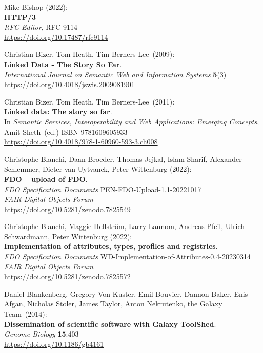 \begin{thebibliography}{9}
Mike Bishop (2022): \\
\textbf{{HTTP}/3}\\
\emph{RFC Editor}, RFC 9114 \\  
\url{https://doi.org/10.17487/rfc9114}

Christian Bizer, Tom Heath, Tim Berners-Lee~(2009):\\
\textbf{Linked Data - The Story So Far}.\\
\emph{International Journal on Semantic Web and Information Systems}
\textbf{5}(3)\\
\url{https://doi.org/10.4018/jswis.2009081901}

Christian Bizer, Tom Heath, Tim Berners-Lee~(2011):\\
\textbf{Linked data: The story so far}.\\
In \emph{Semantic Services, Interoperability and Web Applications:
Emerging Concepts}, Amit Sheth~(ed.) ISBN 9781609605933\\
\url{https://doi.org/10.4018/978-1-60960-593-3.ch008}

Christophe Blanchi, Daan Broeder, Thomas Jejkal, Islam Sharif, Alexander
Schlemmer, Dieter van Uytvanck, Peter Wittenburg (2022): \\
\textbf{FDO -- upload of FDO}.\\
\emph{FDO Specification Documents} PEN-FDO-Upload-1.1-20221017 \\
\emph{FAIR Digital Objects Forum}\\ 
\url{https://doi.org/10.5281/zenodo.7825549}

Christophe Blanchi, Maggie Hellström, Larry Lannom, Andreas Pfeil, Ulrich Schwardmann, Peter Wittenburg (2022): \\
\textbf{Implementation of
attributes, types, profiles and registries}. \\
\emph{FDO Specification Documents} WD-Implementation-of-Attributes-0.4-20230314 \\
\emph{FAIR Digital Objects Forum}\\ 
\url{https://doi.org/10.5281/zenodo.7825572}

Daniel Blankenberg, Gregory Von Kuster, Emil Bouvier, Dannon
Baker, Enis Afgan, Nicholas Stoler, James Taylor, Anton Nekrutenko, the
Galaxy Team~(2014):\\
\textbf{Dissemination of scientific software with Galaxy ToolShed}.\\
\emph{Genome Biology} \textbf{15}:403\\
\url{https://doi.org/10.1186/gb4161}


\end{thebibliography}
